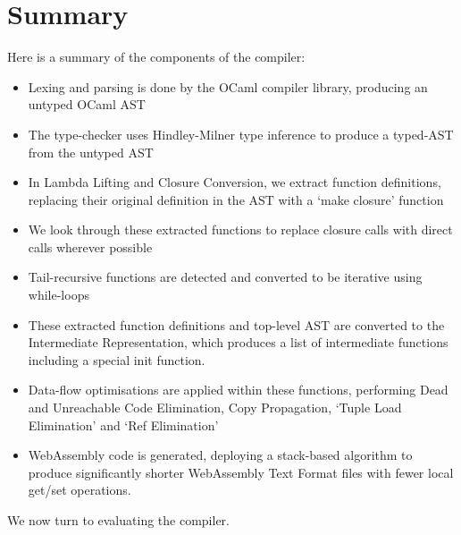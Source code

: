 \section{Summary}
Here is a summary of the components of the compiler:
\begin{itemize}
    \item Lexing and parsing is done by the OCaml compiler library, producing an untyped OCaml AST
    \item The type-checker uses Hindley-Milner type inference to produce a typed-AST from the untyped AST
    \item In Lambda Lifting and Closure Conversion, we extract function definitions, replacing their original definition in the AST with a `make closure' function
    \item We look through these extracted functions to replace closure calls with direct calls wherever possible
    \item Tail-recursive functions are detected and converted to be iterative using while-loops
    \item These extracted function definitions and top-level AST are converted to the Intermediate Representation, which produces a list of intermediate functions including a special init function.
    \item Data-flow optimisations are applied within these functions, performing Dead and Unreachable Code Elimination, Copy Propagation, `Tuple Load Elimination' and `Ref Elimination'
    \item WebAssembly code is generated, deploying a stack-based algorithm to produce significantly shorter WebAssembly Text Format files with fewer local get/set operations.
\end{itemize}
We now turn to evaluating the compiler.